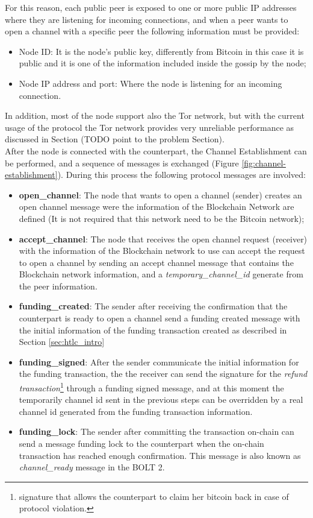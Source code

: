 For this reason, each public peer is exposed to one or more public IP addresses where
they are listening for incoming connections, and when a peer wants to open
a channel with a specific peer the following information must be provided:

\begin{itemize}
  \item Node ID: It is the node's public key, differently from Bitcoin in this case it is public and it is one of the information included inside the gossip by the node;
  \item Node IP address and port: Where the node is listening for an incoming connection.
\end{itemize}

In addition, most of the node support also the Tor network, but with the current usage of the protocol the Tor network provides very unreliable
performance as discussed in Section (TODO point to the problem Section).\\
After the node is connected with the counterpart, the Channel Establishment can be performed, and a sequence
of messages is exchanged (Figure \ref{fig:channel-establishment}). During this process
the following protocol messages are involved:

\begin{itemize}
  \item {\bf open\_channel}: The node that wants to open a channel (sender) creates an open channel message were the information of the
        Blockchain Network are defined (It is not required that this network need to be the Bitcoin network);
  \item {\bf accept\_channel}: The node that receives the open channel request (receiver) with the information of the Blockchain network to use
        can accept the request to open a channel by sending an accept channel message that contains the Blockchain network information, and
        a \emph{temporary\_channel\_id} generate from the peer information.
  \item {\bf funding\_created}: The sender after receiving the confirmation that the counterpart is ready to open a channel
        send a funding created message with the initial information of the funding transaction created as described in Section \ref{sec:htlc_intro}
  \item {\bf funding\_signed}: After the sender communicate the initial information for the funding transaction, the
        the receiver can send the signature for the \emph{refund transaction}\footnote{signature that allows the counterpart to claim her bitcoin back in case of protocol violation.} through a funding signed message, and at this moment the temporarily
        channel id sent in the previous steps can be overridden by a real channel id generated from the funding transaction information.
  \item {\bf funding\_lock}: The sender after committing the transaction on-chain can send a message funding lock to the counterpart when
        the on-chain transaction has reached enough confirmation. This message is also known as \emph{channel\_ready} message in the BOLT 2\cite{bolt2}.
\end{itemize}

